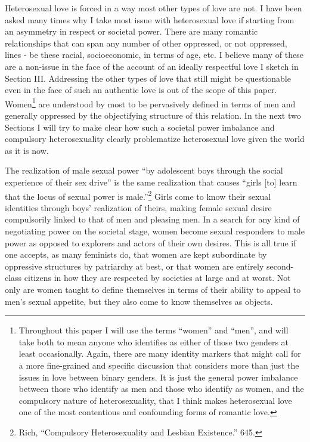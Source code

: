 Heterosexual love is forced in a way most other types of love are not. I
have been asked many times why I take most issue with heterosexual love
if starting from an asymmetry in respect or societal power. There are
many romantic relationships that can span any number of other oppressed,
or not oppressed, lines - be these racial, socioeconomic, in terms of
age, etc. I believe many of these are a non-issue in the face of the
account of an ideally respectful love I sketch in Section III.
Addressing the other types of love that still might be questionable even
in the face of such an authentic love is out of the scope of this paper.
Women\footnote{Throughout this paper I will use the terms ``women'' and
  ``men'', and will take both to mean anyone who identifies as either of
  those two genders at least occasionally. Again, there are many
  identity markers that might call for a more fine-grained and specific
  discussion that considers more than just the issues in love between
  binary genders. It is just the general power imbalance between those
  who identify as men and those who identify as women, and the
  compulsory nature of heterosexuality, that I think makes heterosexual
  love one of the most contentious and confounding forms of romantic
  love.} are understood by most to be pervasively defined in terms of
men and generally oppressed by the objectifying structure of this
relation. In the next two Sections I will try to make clear how such a
societal power imbalance and compulsory heterosexuality clearly
problematize heterosexual love given the world as it is now.

The realization of male sexual power ``by adolescent boys through the
social experience of their sex drive'' is the same realization that
causes ``girls [to] learn that the locus of sexual power is
male.''\footnote{Rich, ``Compulsory Heterosexuality and Lesbian
  Existence.'' 645.} Girls come to know their sexual identities through
boys' realization of theirs, making female sexual desire compulsorily
linked to that of men and pleasing men. In a search for any kind of
negotiating power on the societal stage, women become sexual responders
to male power as opposed to explorers and actors of their own desires.
This is all true if one accepts, as many feminists do, that women are
kept subordinate by oppressive structures by patriarchy at best, or that
women are entirely second-class citizens in how they are respected by
societies at large and at worst. Not only are women taught to define
themselves in terms of their ability to appeal to men's sexual appetite,
but they also come to know themselves as objects.

